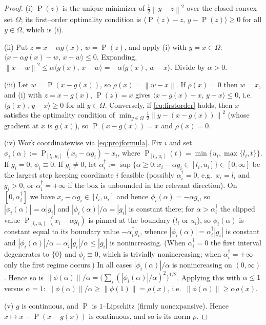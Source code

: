 \documentclass[12pt]{article}
\DeclareMathOperator{\proj}{P}
\newcommand{\norm}[1]{\left\lVert #1 \right\rVert}
\newcommand{\inner}[2]{\langle #1,\, #2\rangle}
\begin{document}
\begin{proof}
(i) $\proj(z)$ is the unique minimizer of $\tfrac12\norm{y-z}^2$ over the
closed convex set $\Omega$; its first--order optimality condition is
$\inner{\proj(z)-z}{y-\proj(z)}\ge0$ for all $y\in\Omega$, which is (i).

(ii) Put $z=x-\alpha g(x)$, $w=\proj(z)$, and apply (i) with $y=x\in\Omega$:
$\inner{x-\alpha g(x)-w}{x-w}\le0$. Expanding,
$\norm{x-w}^2\le\alpha\inner{g(x)}{x-w}=-\alpha\inner{g(x)}{w-x}$. Divide by
$\alpha>0$.

(iii) Let $w=\proj(x-g(x))$, so $\rho(x)=\norm{w-x}$. If $\rho(x)=0$ then
$w=x$, and (i) with $z=x-g(x)$, $\proj(z)=x$ gives
$\inner{x-g(x)-x}{y-x}\le0$, i.e.\ $\inner{g(x)}{y-x}\ge0$ for all
$y\in\Omega$. Conversely, if \eqref{eq:firstorder} holds, then $x$ satisfies
the optimality condition of $\min_{y\in\Omega}\tfrac12\norm{y-(x-g(x))}^2$
(whose gradient at $x$ is $g(x)$), so $\proj(x-g(x))=x$ and $\rho(x)=0$.

(iv) Work coordinatewise via \eqref{eq:projformula}. Fix $i$ and set
$\phi_i(\alpha):=\proj_{[l_i,u_i]}(x_i-\alpha g_i)-x_i$, where
$\proj_{[l_i,u_i]}(t)=\min\{u_i,\max\{l_i,t\}\}$. If $g_i=0$, $\phi_i\equiv0$.
If $g_i\neq0$, let
$\alpha_i^\dagger:=\sup\{\alpha\ge0: x_i-\alpha g_i\in[l_i,u_i]\}\in[0,\infty]$
be the largest step keeping coordinate $i$ feasible (possibly
$\alpha_i^\dagger=0$, e.g.\ $x_i=l_i$ and $g_i>0$, or $\alpha_i^\dagger=+\infty$
if the box is unbounded in the relevant direction). On
$[0,\alpha_i^\dagger]$ we have $x_i-\alpha g_i\in[l_i,u_i]$ and hence
$\phi_i(\alpha)=-\alpha g_i$, so $|\phi_i(\alpha)|=\alpha|g_i|$ and
$|\phi_i(\alpha)|/\alpha=|g_i|$ is constant there; for $\alpha>\alpha_i^\dagger$
the clipped value $\proj_{[l_i,u_i]}(x_i-\alpha g_i)$ is pinned at the boundary
($l_i$ or $u_i$), so $\phi_i(\alpha)$ is constant equal to its boundary value
$-\alpha_i^\dagger g_i$, whence $|\phi_i(\alpha)|=\alpha_i^\dagger|g_i|$ is
constant and $|\phi_i(\alpha)|/\alpha=\alpha_i^\dagger|g_i|/\alpha\le|g_i|$ is
nonincreasing. (When $\alpha_i^\dagger=0$ the first interval degenerates to
$\{0\}$ and $\phi_i\equiv0$, which is trivially nonincreasing; when
$\alpha_i^\dagger=+\infty$ only the first regime occurs.) In
all cases $|\phi_i(\alpha)|/\alpha$ is nonincreasing on $(0,\infty)$. Hence so is
$\norm{\phi(\alpha)}/\alpha=\big(\sum_i(|\phi_i(\alpha)|/\alpha)^2\big)^{1/2}$.
Applying this with $\alpha\le1$ versus $\alpha=1$:
$\norm{\phi(\alpha)}/\alpha\ge\norm{\phi(1)}=\rho(x)$, i.e.\
$\norm{\phi(\alpha)}\ge\alpha\rho(x)$.

(v) $g$ is continuous, and $\proj$ is $1$--Lipschitz (firmly nonexpansive).
Hence $x\mapsto x-\proj(x-g(x))$ is continuous, and so is its norm $\rho$.
\end{proof}
\end{document}
